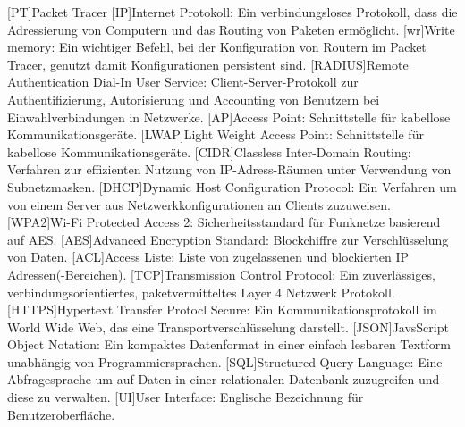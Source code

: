 \begin{acronym}
	[PT]{Packet Tracer}
	[IP]{Internet Protokoll}: Ein verbindungsloses Protokoll, dass die Adressierung von Computern und das Routing von Paketen ermöglicht.
	[wr]{Write memory}: Ein wichtiger Befehl, bei der Konfiguration von Routern im Packet Tracer, genutzt damit Konfigurationen persistent sind.
	[RADIUS]{Remote Authentication Dial-In User Service}: Client-Server-Protokoll zur Authentifizierung, Autorisierung und Accounting von Benutzern bei Einwahlverbindungen in Netzwerke.
	[AP]{Access Point}: Schnittstelle für kabellose Kommunikationsgeräte.
	[LWAP]{Light Weight Access Point}: Schnittstelle für kabellose Kommunikationsgeräte.
	[CIDR]{Classless Inter-Domain Routing}: Verfahren zur effizienten Nutzung von IP-Adress-Räumen unter Verwendung von Subnetzmasken.
	[DHCP]{Dynamic Host Configuration Protocol}: Ein Verfahren um von einem Server aus Netzwerkkonfigurationen an Clients zuzuweisen.
	[WPA2]{Wi-Fi Protected Access 2}: Sicherheitsstandard für Funknetze basierend auf AES.
	[AES]{Advanced Encryption Standard}: Blockchiffre zur Verschlüsselung von Daten.
	[ACL]{Access Liste}: Liste von zugelassenen und blockierten IP Adressen(-Bereichen).
	[TCP]{Transmission Control Protocol}: Ein zuverlässiges, verbindungsorientiertes, paketvermitteltes Layer 4 Netzwerk Protokoll.
	[HTTPS]{Hypertext Transfer Protocl Secure}: Ein Kommunikationsprotokoll im World Wide Web, das eine Transportverschlüsselung darstellt.
	[JSON]{JavsScript Object Notation}:
	Ein kompaktes Datenformat in einer einfach lesbaren Textform unabhängig von Programmiersprachen.
	[SQL]{Structured Query Language}: Eine Abfragesprache um auf Daten in einer relationalen Datenbank zuzugreifen und diese zu verwalten.
	[UI]{User Interface}: Englische Bezeichnung für Benutzeroberfläche.
\end{acronym}